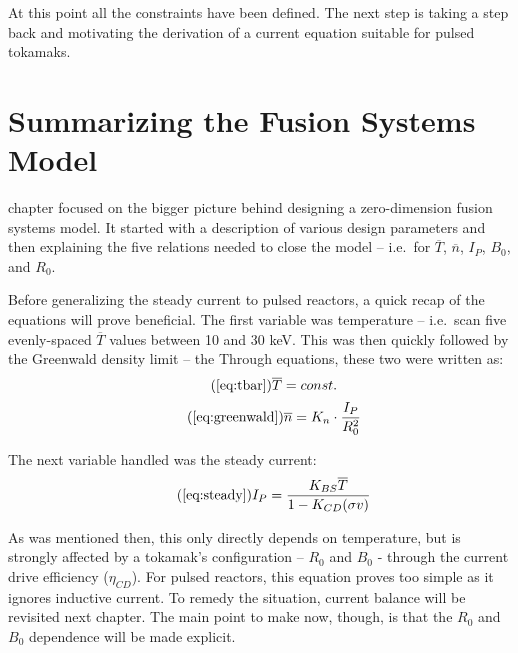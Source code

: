 At this point all the  constraints have been defined. The next step is taking a step back and motivating the derivation of a current equation suitable for pulsed tokamaks.

\section{Summarizing the Fusion Systems Model}

 chapter focused on the bigger picture behind designing a zero-dimension fusion systems model. It started with a description of various design parameters and then  explaining the five relations needed to close the model -- i.e.\ for $\overline T$, $\overline n$, $I_P$, $B_0$, and $R_0$.

Before  generalizing the steady current to  pulsed reactors,  a quick recap of the equations will prove beneficial. The first variable  was temperature -- i.e.\ scan five evenly-spaced $\overline T$ values between 10 and 30 keV. This was then quickly followed by the Greenwald density limit -- the  Through equations, these two were written as: 
\begin{equation}
	\tag{\ref{eq:tbar}}
	\overline T = const.
\end{equation}
\begin{equation}
	\tag{\ref{eq:greenwald}}
	\overline n = K_n \cdot \frac{I_P}{R_0^2}
\end{equation}

The next variable handled was the steady current:
\begin{equation}
	\tag{\ref{eq:steady}}
	I_P = \frac{K_{BS} \overline T}{1 - K_{CD} ( \sigma v ) }
\end{equation}

As was mentioned then, this only directly depends on temperature, but is strongly affected by a tokamak's configuration -- $R_0$ and $B_0$ - through the current drive efficiency ($\eta_{CD}$). For pulsed reactors, this equation proves too simple as it ignores inductive current. To remedy the situation, current balance will be revisited next chapter. The main point to make now, though, is that the $R_0$ and $B_0$ dependence will be made explicit.

